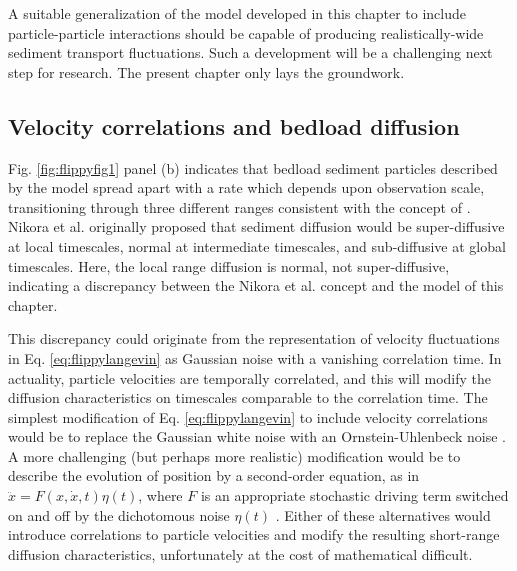 A suitable generalization of the model developed in this chapter to include particle-particle interactions should be capable of producing realistically-wide sediment transport fluctuations. Such a development will be a challenging next step for research. The present chapter only lays the groundwork.

\subsection{Velocity correlations and bedload diffusion}
\label{sec:prollems}

Fig. \ref{fig:flippyfig1} panel (b) indicates that bedload sediment particles described by the model spread apart with a rate which depends upon observation scale, transitioning through three different ranges consistent with the concept of \citet{Nikora2001a,Nikora2002}.
Nikora et al. originally proposed that sediment diffusion would be super-diffusive at local timescales, normal at intermediate timescales, and sub-diffusive at global timescales.
Here, the local range diffusion is normal, not super-diffusive, indicating a discrepancy between the Nikora et al. concept and the model of this chapter.

This discrepancy could originate from the representation of velocity fluctuations in Eq. \ref{eq:flippylangevin} as Gaussian noise with a vanishing correlation time.
In actuality, particle velocities are temporally correlated, and this will modify the diffusion characteristics on timescales comparable to the correlation time. The simplest modification of Eq. \ref{eq:flippylangevin} to include velocity correlations would be to replace the Gaussian white noise with an Ornstein-Uhlenbeck noise \citep[e.g.][]{Luczka2005,Hanggi2007}. A more challenging (but perhaps more realistic) modification would be to describe the evolution of position by a second-order equation, as in $\ddot{x} = F(x,\dot{x},t)\eta(t)$, where $F$ is an appropriate stochastic driving term switched on and off by the dichotomous noise $\eta(t)$ \citep[e.g.][]{Masoliver1993}. Either of these alternatives would introduce correlations to particle velocities and modify the resulting short-range diffusion characteristics, unfortunately at the cost of mathematical difficult.


